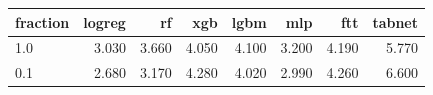 \begin{tabular}{lrrrrrrr}
\toprule
fraction & logreg & rf & xgb & lgbm & mlp & ftt & tabnet \\
\midrule
1.0 & 3.030 & 3.660 & 4.050 & 4.100 & 3.200 & 4.190 & 5.770 \\
0.1 & 2.680 & 3.170 & 4.280 & 4.020 & 2.990 & 4.260 & 6.600 \\
\bottomrule
\end{tabular}
